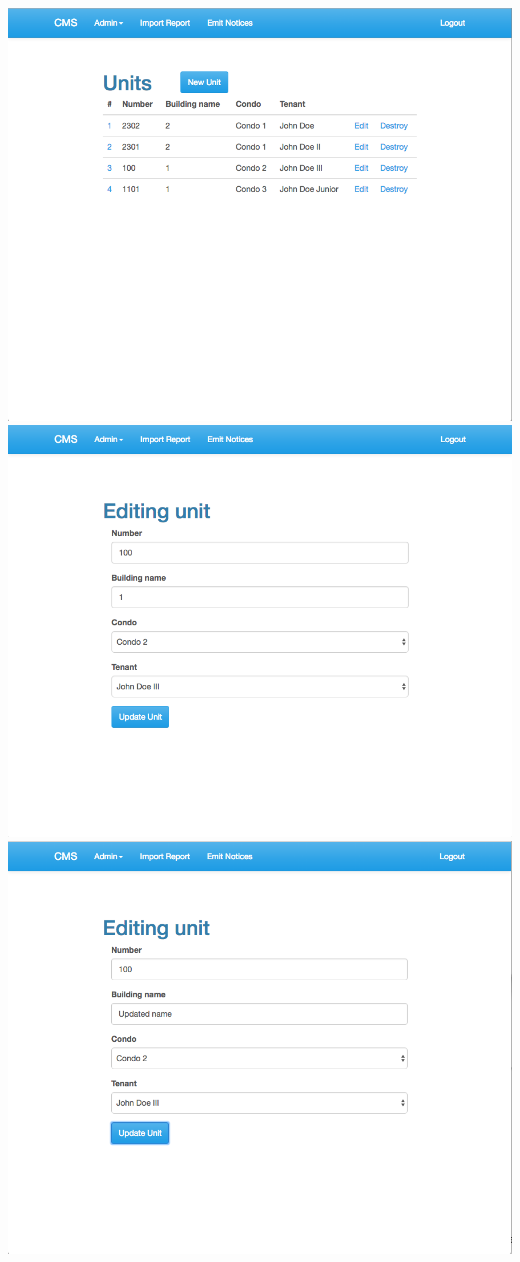 \begin{itemize}
    \includegraphics[scale=0.25]{./images/ss/unit/edit/2.png}\\
    \includegraphics[scale=0.25]{./images/ss/unit/edit/3.png}
    \includegraphics[scale=0.25]{./images/ss/unit/edit/4.png}\\

\end{itemize}
